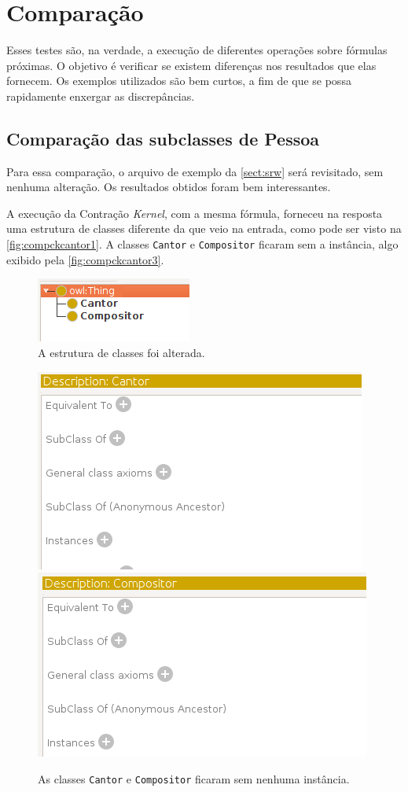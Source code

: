 \section{Comparação}

Esses testes são, na verdade, a execução de diferentes operações sobre fórmulas próximas. O objetivo é verificar se existem diferenças nos resultados que elas fornecem. Os exemplos utilizados são bem curtos, a fim de que se possa rapidamente enxergar as discrepâncias.

\subsection{Comparação das subclasses de Pessoa}

Para essa comparação, o arquivo de exemplo da \autoref{sect:srw} será revisitado, sem nenhuma alteração. Os resultados obtidos foram bem interessantes.

A execução da Contração \textit{Kernel}, com a mesma fórmula, forneceu na resposta uma estrutura de classes diferente da que veio na entrada, como pode ser visto na \autoref{fig:compckcantor1}. A classes \texttt{Cantor} e \texttt{Compositor} ficaram sem a instância, algo exibido pela \autoref{fig:compckcantor3}.

\begin{figure}[H]
	\centering
	\includegraphics[width=0.3\linewidth]{Capitulos/Testes/compckcantor1}
	\caption{A estrutura de classes foi alterada.}
	\label{fig:compckcantor1}
\end{figure}

\begin{figure}[H]
	\centering
	\includegraphics[width=0.44\linewidth]{Capitulos/Testes/compckcantor3}
	\includegraphics[width=0.48\linewidth]{Capitulos/Testes/compckcantor2}
	\caption{As classes \texttt{Cantor} e \texttt{Compositor} ficaram sem nenhuma instância.}
	\label{fig:compckcantor3}
\end{figure}

